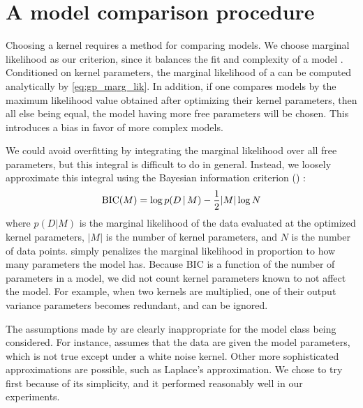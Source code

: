 \section{A model comparison procedure}

Choosing a kernel requires a method for comparing models.
We choose marginal likelihood as our criterion, since it balances the fit and complexity of a model \citep{rasmussen2001occam}.
Conditioned on kernel parameters, the marginal likelihood of a \gp{} can be computed analytically by \cref{eq:gp_marg_lik}.
In addition, if one compares \gp{} models by the maximum likelihood value obtained after optimizing their kernel parameters, then all else being equal, the model having more free parameters will be chosen.
This introduces a bias in favor of more complex models.

We could avoid overfitting by integrating the marginal likelihood over all free parameters, but this integral is difficult to do in general.
Instead, we loosely approximate this integral using the Bayesian information criterion (\BIC{}) \citep{schwarz1978estimating}:
%
\begin{equation}
\textrm{BIC}(M) = \log p(D \,|\, M) - \frac{1}{2} |M| \log N
\end{equation}
%
where $p(D|M)$ is the marginal likelihood of the data evaluated at the optimized kernel parameters, $|M|$ is the number of kernel parameters, and $N$ is the number of data points.
\BIC{} simply penalizes the marginal likelihood in proportion to how many parameters the model has.
Because BIC is a function of the number of parameters in a model, we did not count kernel parameters known to not affect the model.
For example, when two kernels are multiplied, one of their output variance parameters becomes redundant, and can be ignored.

The assumptions made by \BIC{} are clearly inappropriate for the model class being considered.
For instance, \BIC{} assumes that the data are \iid given the model parameters, which is not true except under a white noise kernel.
Other more sophisticated approximations are possible, such as Laplace's approximation.
We chose to try \BIC{} first because of its simplicity, and it performed reasonably well in our experiments.




